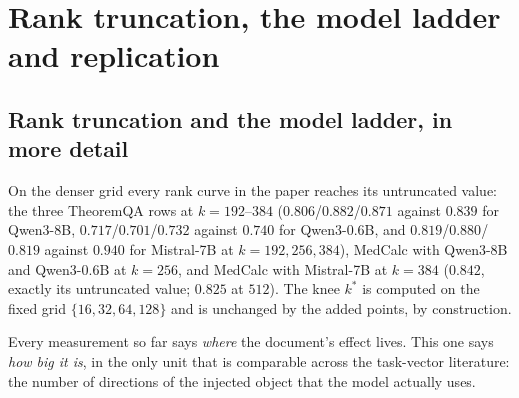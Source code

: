 \section{Rank truncation, the model ladder and replication}
\label{app:scale}

\begin{table}[tbp]
\caption{The channel and the truncation curve at three model widths, each with
its own restricted split and its own injection layer at matched relative depth.
$\rho$ is Eq.~\ref{eq:rho}; \emph{gold} is what the document itself is worth on
that model's restricted items, which is why the $0.6$B and $1.7$B rows have low
absolute accuracy and a large $n$: those models solve almost nothing without the
document, so almost every item qualifies. Qwen3-0.6B and Qwen3-8B are after the
instrument fix; Qwen3-1.7B is before it, and its curve is not monotone, so its
$k^{*}$ is not interpretable. $k^{*}$ sits between $32$ and $64$ at $d=1024$
and at $d=4096$ alike; a width-proportional account predicts $k\approx12$ for
the first. Mistral-7B is in Table~\ref{tab:replicationfull}.}
\label{tab:laddermodels}
\centering
\footnotesize
\setlength{\tabcolsep}{3pt}

\end{table}

\subsection{Rank truncation and the model ladder, in more detail}
\label{app:rank2}

On the denser grid every rank curve in the paper reaches its untruncated value:
the three TheoremQA rows at $k=192$--$384$ ($0.806$/$0.882$/$0.871$ against
$0.839$ for Qwen3-8B, $0.717$/$0.701$/$0.732$ against $0.740$ for Qwen3-0.6B,
and $0.819$/$0.880$/$0.819$ against $0.940$ for Mistral-7B at $k=192,256,384$),
MedCalc with Qwen3-8B and Qwen3-0.6B at $k=256$, and MedCalc with Mistral-7B at
$k=384$ ($0.842$, exactly its untruncated value; $0.825$ at $512$). The knee
$k^{*}$ is computed on the fixed grid $\{16,32,64,128\}$ and is unchanged by
the added points, by construction.

Every measurement so far says \emph{where} the document's effect lives. This one
says \emph{how big it is}, in the only unit that is comparable across the
task-vector literature: the number of directions of the injected object that the
model actually uses.

